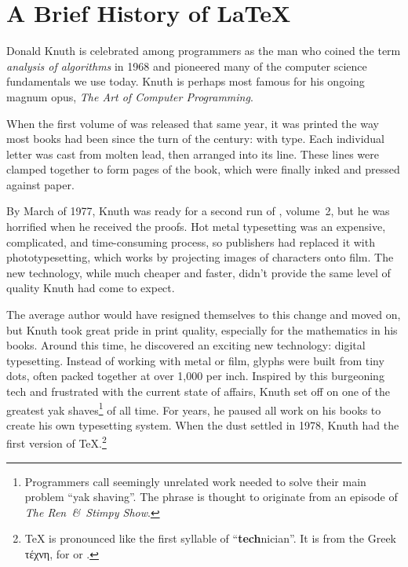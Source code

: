 \chapter{A Brief History of \texorpdfstring{\LaTeX}{LaTeX}}

\label{history}

Donald Knuth is celebrated among programmers as
the man who coined the term \emph{analysis of algorithms} in 1968
and pioneered many of the computer science fundamentals we use today.
Knuth is perhaps most famous for his ongoing magnum opus,
\textit{The Art of Computer Programming}.

When the first volume of  was released that same year,
it was printed the way most books had been since the turn of the century:
with  type.
Each individual letter was cast from molten lead,
then arranged into its line.
These lines were clamped together to form pages of the book,
which were finally inked and pressed against paper.

By March of 1977, Knuth was ready for a second run of , volume~2,
but he was horrified when he received the proofs.
Hot metal typesetting was an expensive, complicated, and time-consuming process,
so publishers had replaced it with phototypesetting,
which works by projecting images of characters onto film.
The new technology, while much cheaper and faster,
didn't provide the same level of quality Knuth had come to
expect.\punckern{}

The average author would have resigned themselves to this change and moved on,
but Knuth took great pride in print quality,
especially for the mathematics in his books.
Around this time, he discovered an exciting new technology:
digital typesetting.
Instead of working with metal or film,
glyphs were built from tiny dots,
often packed together at over 1,000 per inch.
Inspired by this burgeoning tech and frustrated with the current state of affairs,
Knuth set off on one of the greatest yak shaves\footnote{Programmers
call seemingly unrelated work needed to solve their main problem
``yak shaving''\quotekern. The phrase is thought to originate from an episode
of \textit{The Ren~\&~Stimpy Show}.\punckern{}}
of all time.
For years, he paused all work on his books to create his own
typesetting system.
When the dust settled in 1978, Knuth had the first version of
\TeX.\punckern\footnote{\TeX{} is pronounced like the first syllable of
``\textbf{tech}nician''\quotekern. It is from the Greek
{τέχνη},
for  or .\punckern{}}

